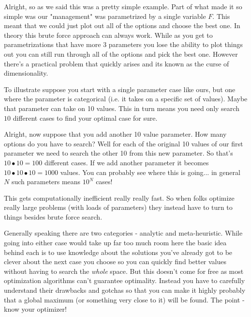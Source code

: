 \documentclass[11pt,a5paper]{book}
\begin{document}
Alright, so as we said this was a pretty simple example. Part of what made it so simple was our "management" was parametrized by a single variable $F$. This meant that we could just plot out all of the options and choose the best one. In theory this brute force approach can always work. While as you get to parametrizations that have more 3 parameters you lose the ability to plot things out you can still run through all of the options and pick the best one. However there's a practical problem that quickly arises and its known as the curse of dimensionality. 
\newline

To illustrate suppose you start with a single parameter case like ours, but one where the parameter is categorical (i.e. it takes on a specific set of values). Maybe that parameter can take on 10 values. This in turn means you need only search $10$ different cases to find your optimal case for sure. 
\newline

Alright, now suppose that you add another 10 value parameter. How many options do you have to search? Well for each of the original 10 values of our first parameter we need to search the other 10 from this new parameter. So that's $10\bullet 10=100$ different cases. If we add another parameter it becomes $10\bullet 10\bullet 10=1000$ values. You can probably see where this is going... in general $N$ such parameters means $10^N$ cases!
\newline

This gets computationally inefficient really really fast. So when folks optimize really large problems (with loads of parameters) they instead have to turn to things besides brute force search.
\newline

Generally speaking there are two categories - analytic and meta-heuristic. While going into either case would take up far too much room here the basic idea behind each is to use knowledge about the solutions you've already got to be clever about the next case you choose so you can quickly find better values without having to search the \textit{whole} space. But this doesn't come for free as most optimization algorithms can't guarantee optimality. Instead you have to carefully understand their drawbacks and gotchas so that you can make it highly probably that a global maximum (or something very close to it) will be found. The point - know your optimizer! 
\newpage
\end{document}
